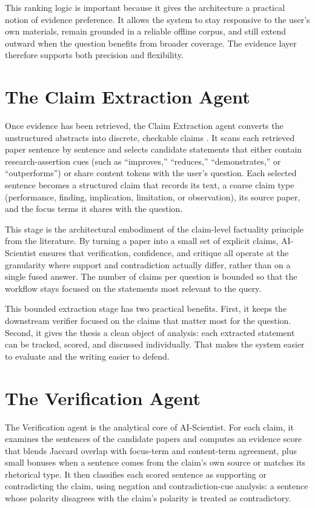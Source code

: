 This ranking logic is important because it gives the architecture a practical notion of evidence preference. It
allows the system to stay responsive to the user's own materials, remain grounded in a reliable offline corpus, and
still extend outward when the question benefits from broader coverage. The evidence layer therefore supports both
precision and flexibility.

\section{The Claim Extraction Agent }

Once evidence has been retrieved, the Claim Extraction agent converts the unstructured abstracts into discrete,
checkable claims \cite{thorne2018fever,wadden2020scifact}. It scans each retrieved paper sentence by sentence and selects candidate statements that either
contain research-assertion cues (such as ``improves,'' ``reduces,'' ``demonstrates,'' or ``outperforms'') or share
content tokens with the user's question. Each selected sentence becomes a structured claim that records its text, a
coarse claim type (performance, finding, implication, limitation, or observation), its source paper, and the focus
terms it shares with the question.

This stage is the architectural embodiment of the claim-level factuality principle from the literature. By turning
a paper into a small set of explicit claims, AI-Scientist ensures that verification, confidence, and critique all
operate at the granularity where support and contradiction actually differ, rather than on a single fused answer.
The number of claims per question is bounded so that the workflow stays focused on the statements most relevant to
the query.

This bounded extraction stage has two practical benefits. First, it keeps the downstream verifier focused on the
claims that matter most for the question. Second, it gives the thesis a clean object of analysis: each extracted
statement can be tracked, scored, and discussed individually. That makes the system easier to evaluate and the
writing easier to defend.

\section{The Verification Agent }

The Verification agent is the analytical core of AI-Scientist. For each claim, it examines the sentences of the
candidate papers and computes an evidence score that blends Jaccard overlap with focus-term and content-term
agreement, plus small bonuses when a sentence comes from the claim's own source or matches its rhetorical type. It
then classifies each scored sentence as supporting or contradicting the claim, using negation and
contradiction-cue analysis: a sentence whose polarity disagrees with the claim's polarity is treated as
contradictory.

